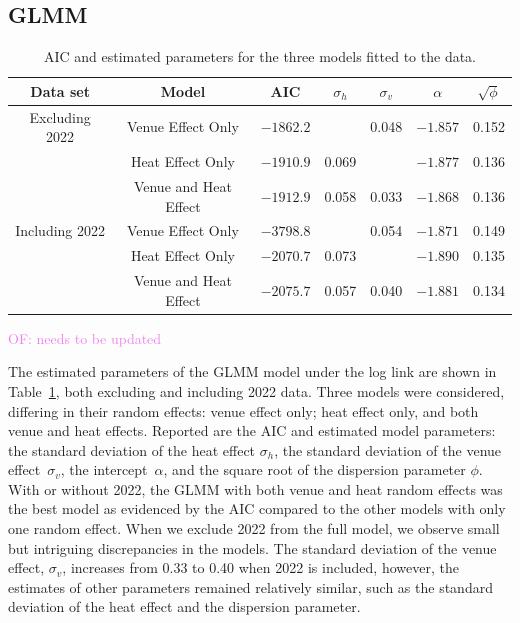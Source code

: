 \documentclass[12pt, letterpaper]{article}
\newcommand{\of}[1]{\textcolor{violet}{OF: #1}}
\begin{document}
\subsection{GLMM} \label{subsec:Results_GLMM}

\begin{table}
  \centering
  \caption{AIC and estimated parameters for the three models fitted to the
    data.}
  \label{tab:Gamma_parameters}
  \begin{tabular}{c c c c c c c}
    \toprule
    Data set & Model & AIC & $\sigma_h$ & $\sigma_v$ & $\alpha$ & $\sqrt{\phi}$ \\
    \midrule
    Excluding 2022 &
      Venue Effect Only & $-1862.2$ &   & 0.048 & $-1.857$ & 0.152\\
     & Heat Effect Only & $-1910.9$ & 0.069 &  & $-1.877$ & 0.136\\
     & Venue and Heat Effect & $-1912.9$ & 0.058 & 0.033 & $-1.868$ & 0.136\\[1ex]
    Including 2022 &
    Venue Effect Only & $-3798.8$ &   & 0.054 & $-1.871$ & 0.149\\
    & Heat Effect Only & $-2070.7$ & 0.073 &  & $-1.890$ & 0.135\\
    & Venue and Heat Effect & $-2075.7$ & 0.057 & 0.040 & $-1.881$ & 0.134\\
    \bottomrule
  \end{tabular}
\end{table}
\of{needs to be updated}

The estimated parameters of the GLMM model under the log link are shown in 
Table~\ref{tab:Gamma_parameters}, both excluding and including 2022 data.
Three models were considered, differing in their random effects: venue effect
only; heat effect only, and both venue and heat effects. Reported are the AIC
and estimated model parameters: the standard deviation
of the heat effect $\sigma_h$, the standard deviation of the venue
effect~$\sigma_v$, the intercept~$\alpha$, and the
square root of the dispersion parameter $\phi$. With or without 2022,
the GLMM with both venue and heat random effects was the best model as evidenced
by the AIC compared to the other models with only one random
effect.  When we exclude 2022 from the full model, we observe small but intriguing
discrepancies in the models. The standard deviation of the venue effect, 
$\sigma_v$, increases from 0.33 to 0.40 when 2022 is included, however, the
estimates of other parameters
remained relatively similar, such as the standard deviation of the heat effect
and the dispersion parameter.
\end{document}
